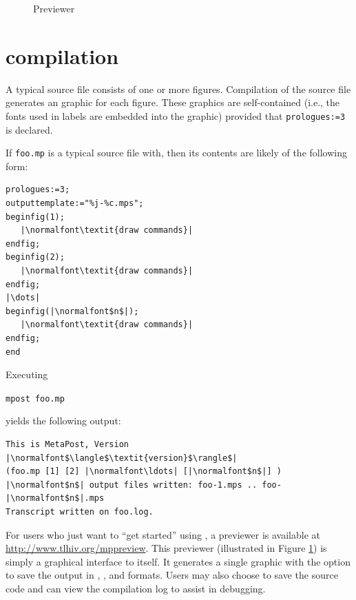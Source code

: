 \begin{figure}
	\begin{center}
		\caption{\MP{} Previewer}\label{fig:previewer}
	\end{center}
\end{figure}

\section{\MP{} compilation}
\label{sec:mpcompilation}

A typical \MP{} source file consists of one or more figures.  Compilation of the source file generates an \EPS{} graphic for each figure.  These \EPS{} graphics are self-contained (i.e., the fonts used in labels are embedded into the graphic) provided that \lstinline{prologues:=3} is declared.

If \texttt{foo.mp} is a typical \MP{} source file with, then its contents are likely of the following form:
\begin{lstlisting}[xleftmargin=1.25\parindent]
prologues:=3;
outputtemplate:="%j-%c.mps";
beginfig(1);
   |\normalfont\textit{draw commands}|
endfig;
beginfig(2);
   |\normalfont\textit{draw commands}|
endfig;
|\dots|
beginfig(|\normalfont$n$|);
   |\normalfont\textit{draw commands}|
endfig;
end
\end{lstlisting}
Executing \begin{flushleft}\hspace*{1.25\parindent}\texttt{mpost foo.mp}\end{flushleft} yields the following output:
\begin{lstlisting}[xleftmargin=1.25\parindent]
This is MetaPost, Version |\normalfont$\langle$\textit{version}$\rangle$|
(foo.mp [1] [2] |\normalfont\ldots| [|\normalfont$n$|] )
|\normalfont$n$| output files written: foo-1.mps .. foo-|\normalfont$n$|.mps
Transcript written on foo.log.
\end{lstlisting}

For users who just want to ``get started'' using \MP{}, a \MP{} previewer is available at \url{http://www.tlhiv.org/mppreview}.  This previewer (illustrated in Figure \ref{fig:previewer}) is simply a graphical interface to \MP{} itself.
It generates a single graphic with the option to save the output in \EPS{}, \PDF{}, and \SVG{} formats.  Users may also choose to save the source code and can view the compilation log to assist in debugging.
